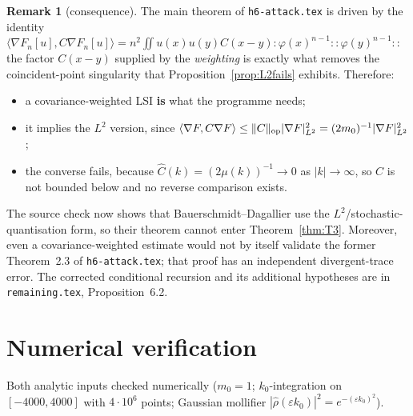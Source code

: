 \documentclass[11pt,a4paper]{article}
\theoremstyle{plain}
\theoremstyle{definition}
\newtheorem{remark}[theorem]{Remark}
\newcommand{\ip}[2]{\langle #1,#2\rangle}
\begin{document}
\begin{remark}[consequence]\label{rem:consequence}
The main theorem of \texttt{h6-attack.tex} is driven by the identity
$\ip{\nabla F_n[u]}{C\nabla F_n[u]}
=n^2\iint u(x)u(y)C(x-y){:}\varphi(x)^{n-1}{:}{:}\varphi(y)^{n-1}{:}$: the factor $C(x-y)$
supplied by the \emph{weighting} is exactly what removes the coincident-point singularity that
Proposition~\ref{prop:L2fails} exhibits. Therefore:
\begin{itemize}
\item a covariance-weighted LSI \textbf{is} what the programme needs;
\item it implies the $L^2$ version, since
      $\ip{\nabla F}{C\nabla F}\le\|C\|_{\rm op}|\nabla F|^2_{L^2}=(2m_0)^{-1}|\nabla F|^2_{L^2}$;
\item the converse fails, because $\widehat C(k)=(2\mu(k))^{-1}\to0$ as $|k|\to\infty$, so $C$ is
      not bounded below and no reverse comparison exists.
\end{itemize}
The source check now shows that Bauerschmidt--Dagallier use the
$L^2$/stochastic-quantisation form, so their theorem cannot enter Theorem~\ref{thm:T3}.  Moreover,
even a covariance-weighted estimate would not by itself validate the former Theorem~2.3 of
\texttt{h6-attack.tex}; that proof has an independent divergent-trace error.  The corrected
conditional recursion and its additional hypotheses are in \texttt{remaining.tex},
Proposition~6.2.
\end{remark}

\section{Numerical verification}\label{sec:num}

Both analytic inputs checked numerically ($m_0=1$; $k_0$-integration on $[-4000,4000]$ with
$4\cdot10^6$ points; Gaussian mollifier $|\hat\rho(\varepsilon k_0)|^2=e^{-(\varepsilon k_0)^2}$).
\end{document}
